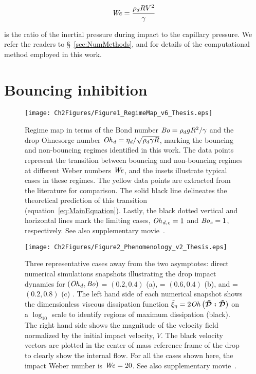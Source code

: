 \begin{align}
	\mathit{We} = \frac{\rho_d R V^2}{\gamma}
\end{align}

\noindent is the ratio of the inertial pressure during impact to the capillary pressure. We refer the readers to \S~\ref{sec:NumMethods}, and \citet{popinet2009accurate, popinet2015quadtree, basiliskpopinet1, zhang2022impact, basiliskVatsalViscousBouncing} for details of the computational method employed in this work.

\section{Bouncing inhibition}
\label{sec:bouncingInhibition}
\begin{figure}
	\centering
	\texttt{[image: Ch2Figures/Figure1\_RegimeMap\_v6\_Thesis.eps]}
	\caption{Regime map in terms of the Bond number $\mathit{Bo} = \rho_dgR^2/\gamma$ and the drop Ohnesorge number $\mathit{Oh}_\mathit{d} = \eta_d/\sqrt{\rho_d\gamma R}$, marking the bouncing and non-bouncing regimes identified in this work. The data points represent the transition between bouncing and non-bouncing regimes at different Weber numbers $\mathit{We}$, and the insets illustrate typical cases in these regimes. The yellow data points are extracted from the literature for comparison. The solid black line delineates the theoretical prediction of this transition (equation~\eqref{eq:MainEquation}). Lastly, the black dotted vertical and horizontal lines mark the limiting cases, $\mathit{Oh}_\mathit{d,c} = 1$ and $\mathit{Bo}_\mathit{c} = 1$, respectively. See also supplementary movie~.}
	\label{fig:RegimeMap}
\end{figure}
\begin{sidewaysfigure}
	\centering
	\texttt{[image: Ch2Figures/Figure2\_Phenomenology\_v2\_Thesis.eps]}
	\caption{Three representative cases away from the two asymptotes: direct numerical simulations snapshots illustrating the drop impact dynamics for $\left(\mathit{Oh}_\mathit{d}, \mathit{Bo}\right)$ = $\left(0.2, 0.4\right)$ (a), = $\left(0.6, 0.4\right)$ (b), and = $\left(0.2, 0.8\right)$ (c) . The left hand side of each numerical snapshot shows the dimensionless viscous dissipation function $\tilde{\xi}_\eta = 2\mathit{Oh}\left(\boldsymbol{\tilde{\mathcal{D}}:\tilde{\mathcal{D}}}\right)$ on a $\log_{10}$ scale to identify regions of maximum dissipation (black). The right hand side shows the magnitude of the velocity field normalized by the initial impact velocity, $V$. The black velocity vectors are plotted in the center of mass reference frame of the drop to clearly show the internal flow. For all the cases shown here, the impact Weber number is $\mathit{We} = 20$. See also supplementary movie~.}
	\label{fig:Phenomenology}
\end{sidewaysfigure}

